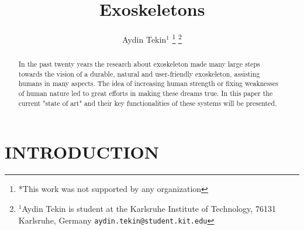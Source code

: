 \documentclass[letterpaper, 10 pt, conference]{ieeeconf}  %
\title{\LARGE \bf
Exoskeletons
}
\author{Aydin Tekin$^{1}$%
\thanks{*This work was not supported by any organization}%
\thanks{$^{1}$Aydin Tekin is student at the Karlsruhe Institute of Technology, 76131 Karlsruhe, Germany
        {\tt\small aydin.tekin@student.kit.edu}}%
}
\begin{document}
\maketitle
\thispagestyle{empty}
\pagestyle{empty}


\begin{abstract}

In the past twenty years the research about exoskeleton made many large steps towards the vision of a durable, natural and user-friendly exoskeleton, assisting humans in many aspects. The idea of increasing human strength or fixing weaknesses of human nature led to great efforts in making these dreams true. In this paper the current "state of art" and their key functionalities of these systems will be presented.

\end{abstract}


\section{INTRODUCTION}
\end{document}
